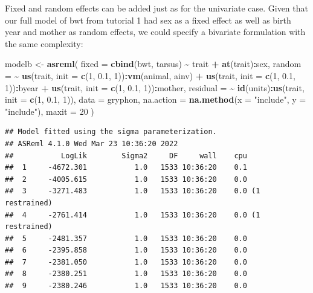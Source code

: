 \documentclass[
  12pt,
]{book}
\newenvironment{Shaded}{\begin{snugshade}}{\end{snugshade}}
\newcommand{\DataTypeTok}[1]{\textcolor[rgb]{0.13,0.29,0.53}{#1}}
\newcommand{\DecValTok}[1]{\textcolor[rgb]{0.00,0.00,0.81}{#1}}
\newcommand{\FloatTok}[1]{\textcolor[rgb]{0.00,0.00,0.81}{#1}}
\newcommand{\KeywordTok}[1]{\textcolor[rgb]{0.13,0.29,0.53}{\textbf{#1}}}
\newcommand{\NormalTok}[1]{#1}
\newcommand{\OperatorTok}[1]{\textcolor[rgb]{0.81,0.36,0.00}{\textbf{#1}}}
\newcommand{\StringTok}[1]{\textcolor[rgb]{0.31,0.60,0.02}{#1}}
\begin{document}
Fixed and random effects can be added just as for the univariate case. Given that our full model of bwt from tutorial 1 had sex as a fixed effect as well as birth year and mother as random effects, we could specify a bivariate formulation with the same complexity:

\begin{Shaded}
\begin{Highlighting}[]
\NormalTok{modelb \textless{}{-}}\StringTok{ }\KeywordTok{asreml}\NormalTok{(}
  \DataTypeTok{fixed =} \KeywordTok{cbind}\NormalTok{(bwt, tarsus) }\OperatorTok{\textasciitilde{}}\StringTok{ }\NormalTok{trait }\OperatorTok{+}\StringTok{ }\KeywordTok{at}\NormalTok{(trait)}\OperatorTok{:}\NormalTok{sex,}
  \DataTypeTok{random =} \OperatorTok{\textasciitilde{}}\StringTok{ }\KeywordTok{us}\NormalTok{(trait, }\DataTypeTok{init =} \KeywordTok{c}\NormalTok{(}\DecValTok{1}\NormalTok{, }\FloatTok{0.1}\NormalTok{, }\DecValTok{1}\NormalTok{))}\OperatorTok{:}\KeywordTok{vm}\NormalTok{(animal, ainv) }\OperatorTok{+}
\StringTok{    }\KeywordTok{us}\NormalTok{(trait, }\DataTypeTok{init =} \KeywordTok{c}\NormalTok{(}\DecValTok{1}\NormalTok{, }\FloatTok{0.1}\NormalTok{, }\DecValTok{1}\NormalTok{))}\OperatorTok{:}\NormalTok{byear }\OperatorTok{+}
\StringTok{    }\KeywordTok{us}\NormalTok{(trait, }\DataTypeTok{init =} \KeywordTok{c}\NormalTok{(}\DecValTok{1}\NormalTok{, }\FloatTok{0.1}\NormalTok{, }\DecValTok{1}\NormalTok{))}\OperatorTok{:}\NormalTok{mother,}
  \DataTypeTok{residual =} \OperatorTok{\textasciitilde{}}\StringTok{ }\KeywordTok{id}\NormalTok{(units)}\OperatorTok{:}\KeywordTok{us}\NormalTok{(trait, }\DataTypeTok{init =} \KeywordTok{c}\NormalTok{(}\DecValTok{1}\NormalTok{, }\FloatTok{0.1}\NormalTok{, }\DecValTok{1}\NormalTok{)),}
  \DataTypeTok{data =}\NormalTok{ gryphon,}
  \DataTypeTok{na.action =} \KeywordTok{na.method}\NormalTok{(}\DataTypeTok{x =} \StringTok{"include"}\NormalTok{, }\DataTypeTok{y =} \StringTok{"include"}\NormalTok{),}
  \DataTypeTok{maxit =} \DecValTok{20}
\NormalTok{)}
\end{Highlighting}
\end{Shaded}

\begin{verbatim}
## Model fitted using the sigma parameterization.
## ASReml 4.1.0 Wed Mar 23 10:36:20 2022
##           LogLik        Sigma2     DF     wall    cpu
##  1     -4672.301           1.0   1533 10:36:20    0.1
##  2     -4005.615           1.0   1533 10:36:20    0.0
##  3     -3271.483           1.0   1533 10:36:20    0.0 (1 restrained)
##  4     -2761.414           1.0   1533 10:36:20    0.0 (1 restrained)
##  5     -2481.357           1.0   1533 10:36:20    0.0
##  6     -2395.858           1.0   1533 10:36:20    0.0
##  7     -2381.050           1.0   1533 10:36:20    0.0
##  8     -2380.251           1.0   1533 10:36:20    0.0
##  9     -2380.246           1.0   1533 10:36:20    0.0
\end{verbatim}
\end{document}
